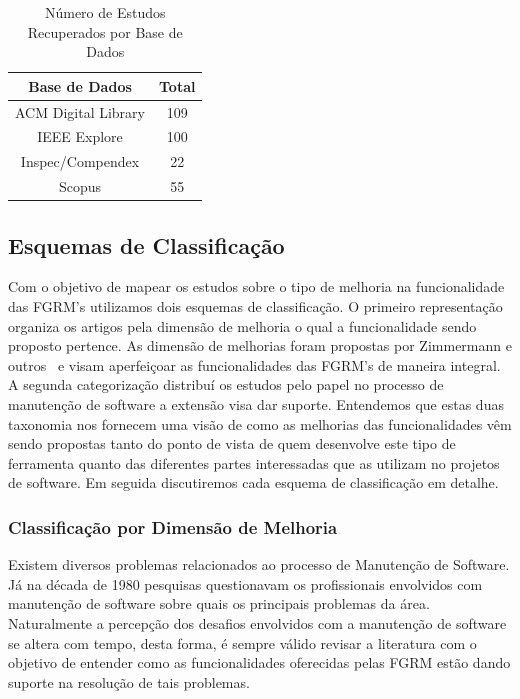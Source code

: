 \begin{table}[htb] \centering \caption{Número de Estudos Recuperados por Base de
		Dados}\label{tab:estudos-por-base-dados} \begin{tabular}{cc} \hline
		\textbf{Base de Dados} & \textbf{Total} \\ \hline ACM Digital Library
		& 109            \\ IEEE Explore           & 100            \\
		Inspec/Compendex       & 22             \\ Scopus                 & 55
		\\ \hline \end{tabular}

\end{table}

\subsection{Esquemas de Classificação}
\label{subsec:map-esquemas-classificacao}

Com o objetivo de mapear os estudos sobre o tipo de melhoria na funcionalidade
das FGRM's utilizamos dois esquemas de classificação. O primeiro representação
organiza os artigos pela dimensão de melhoria o qual a funcionalidade sendo
proposto pertence. As dimensão de melhorias foram propostas por Zimmermann e
outros~\cite{zimmermann2009improving} e visam aperfeiçoar as funcionalidades das
FGRM's de maneira integral. A segunda categorização distribuí os estudos pelo
papel no processo de manutenção de software a extensão visa dar suporte.
Entendemos que estas duas taxonomia nos fornecem uma visão de como as melhorias
das funcionalidades vêm sendo propostas tanto do ponto de vista de quem
desenvolve este tipo de ferramenta quanto das diferentes partes interessadas que
as utilizam no projetos de software. Em seguida discutiremos cada esquema de
classificação em detalhe.

\subsubsection{Classificação por Dimensão de Melhoria} 
\label{subsubsec:map-esquema-suporte-problema}

Existem diversos problemas relacionados ao processo de Manutenção de Software.
Já na década de 1980 pesquisas questionavam os profissionais envolvidos com
manutenção de software sobre quais os principais problemas da
área\cite{Lientz:1981:PAS:358790.358796}. Naturalmente a percepção dos desafios
envolvidos com a manutenção de software se altera com tempo, desta forma, é
sempre válido revisar a literatura com o objetivo de entender como as
funcionalidades oferecidas pelas FGRM estão dando suporte na resolução de tais
problemas.

